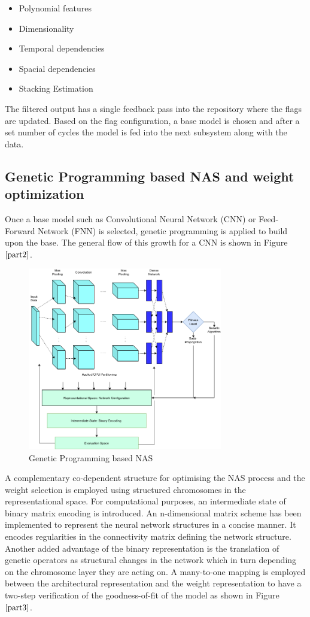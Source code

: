 \documentclass[conference]{IEEEtran}
\begin{document}
\begin{itemize}
\item Polynomial features
\item Dimensionality
\item Temporal dependencies
\item Spacial dependencies
\item Stacking Estimation
\end{itemize}

The filtered output has a single feedback pass into the repository where the flags are updated. Based on the flag configuration, a base model is chosen and after a set number of cycles the model is fed into the next subsystem along with the data. 

\subsection{Genetic Programming based NAS and weight optimization}

Once a base model such as Convolutional Neural Network (CNN) or Feed-Forward Network (FNN) is selected, genetic programming is applied to build upon the base. The general flow of this growth for a CNN is shown in Figure $\ref{part2}$. 

\begin{figure}[!b]
\centerline{\includegraphics[width=85mm]{part2.png}}
\caption{Genetic Programming based NAS}
\label{part2}
\end{figure}

A complementary co-dependent structure for optimising the NAS process and the weight selection is employed using structured chromosomes in the representational space. For computational purposes, an intermediate state of binary matrix encoding is introduced. An n-dimensional matrix scheme has been implemented to represent the neural network structures in a concise manner. It encodes regularities in the connectivity matrix defining the network structure. Another added advantage of the binary representation is the translation of genetic operators as structural changes in the network which in turn depending on the chromosome layer they are acting on. A many-to-one mapping is employed between the architectural representation and the weight representation to have a two-step verification of the goodness-of-fit of the model as shown in Figure $\ref{part3}$.
\end{document}
